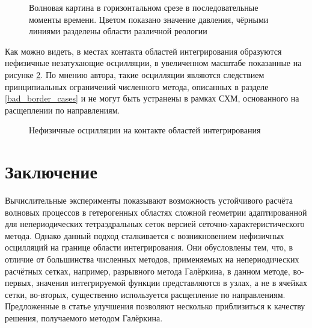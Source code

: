 \documentclass[a4paper]{article}
\numberwithin{equation}{section}
\begin{document}
\begin{figure}[H]
\begin{subfigure}{.25\textwidth}
\end{subfigure}
\caption{Волновая картина в горизонтальном срезе в последовательные моменты времени. 
Цветом показано значение давления, чёрными линиями разделены области различной реологии}
\label{fig:waves-z}
\end{figure}
Как можно видеть, в местах контакта областей интегрирования 
образуются нефизичные незатухающие осцилляции, в увеличенном масштабе показанные на рисунке 
\ref{pic:oscillations}. По мнению автора, такие осцилляции являются следствием принципиальных 
ограничений численного метода, описанных в разделе \ref{bad_border_cases} и 
не могут быть устранены в рамках СХМ, основанного на расщеплении по направлениям. 
\begin{figure}[H]
	\caption{Нефизичные осцилляции на контакте областей интегрирования}
	\label{pic:oscillations}
\end{figure}


\section{Заключение}
Вычислительные эксперименты показывают возможность устойчивого расчёта 
волновых процессов в гетерогенных областях сложной геометрии 
адаптированной для непериодических тетраэдральных сеток 
версией сеточно-характеристического метода. 
Однако данный подход сталкивается с возникновением нефизичных осцилляций 
на границе области интегрирования. 
Они обусловлены тем, что, в отличие от большинства численных методов, 
применяемых на непериодических расчётных сетках, например, 
разрывного метода Галёркина, в данном методе, 
во-первых, значения интегрируемой функции представляются в узлах, а не в ячейках сетки, 
во-вторых, существенно используется расщепление по направлениям. 
Предложенные в статье улучшения позволяют несколько приблизиться к качеству 
решения, получаемого методом Галёркина. 
\end{document}

